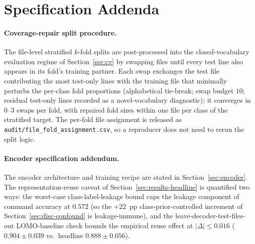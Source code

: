 \documentclass[sensors,article,submit,moreauthors,pdftex]{Definitions/mdpi}
\begin{document}
\appendix
\section{Specification Addenda}
\label{app3:addenda}\label{app:spec-addenda}

\paragraph{Coverage-repair split procedure.} The file-level stratified $k$-fold splits are post-processed into the closed-vocabulary evaluation regime of Section~\ref{sec:cv} by swapping files until every test line also appears in its fold's training partner. Each swap exchanges the test file contributing the most test-only lines with the training file that minimally perturbs the per-class fold proportions (alphabetical tie-break; swap budget $10$; residual test-only lines recorded as a novel-vocabulary diagnostic); it converges in $0$--$3$ swaps per fold, with repaired fold sizes within one file per class of the stratified target. The per-fold file assignment is released as \texttt{audit/file\_fold\_assignment.csv}, so a reproducer does not need to rerun the split logic.

\paragraph{Encoder specification addendum.} The encoder architecture and training recipe are stated in Section~\ref{sec:encoder}. The representation-reuse caveat of Section~\ref{sec:results-headline} is quantified two ways: the worst-case class-label-leakage bound caps the leakage component of command accuracy at $0.572$ (so the $+22$~pp class-prior-controlled increment of Section~\ref{sec:disc-confound} is leakage-immune), and the leave-decoder-test-files-out LOMO-baseline check bounds the empirical reuse effect at $|\Delta|\!\le\!0.016$ ($0.904 \pm 0.039$ vs.\ headline $0.888 \pm 0.056$).
\end{document}
